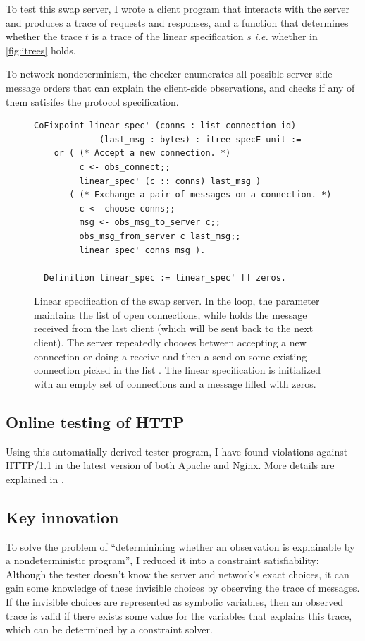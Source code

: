 To test this swap server, I wrote a client program that interacts with the
server and produces a trace of requests and responses, and a function that
determines whether the trace $t$ is a trace of the linear specification $s$ {\it
  i.e.} whether  in \autoref{fig:itrees} holds.

To network nondeterminism, the checker enumerates all possible server-side
message orders that can explain the client-side observations, and checks if any
of them satisifes the protocol specification.
\begin{figure}
\begin{lstlisting}[style=customcoq]
  CoFixpoint linear_spec' (conns : list connection_id)
             (last_msg : bytes) : itree specE unit :=
    or ( (* Accept a new connection. *)
         c <- obs_connect;;
         linear_spec' (c :: conns) last_msg )
       ( (* Exchange a pair of messages on a connection. *)
         c <- choose conns;;
         msg <- obs_msg_to_server c;;
         obs_msg_from_server c last_msg;;
         linear_spec' conns msg ).

  Definition linear_spec := linear_spec' [] zeros.
\end{lstlisting}
\caption[Linear specification of a swap server.]{Linear specification of the
  swap server.  In the  loop, the parameter 
  maintains the list of open connections, while  holds the message
  received from the last client (which will be sent back to the next client).
  The server repeatedly chooses between accepting a new connection or doing a
  receive and then a send on some existing connection picked in the list
  .  The linear specification is initialized with an empty set of
  connections and a message filled with zeros.}
\label{fig:linear-spec}
\end{figure}

\subsection{Online testing of HTTP}

Using this automatially derived tester program, I have found violations against
HTTP/1.1 in the latest version of both Apache and Nginx.  More details are
explained in \textcite{issta21}.

\subsection{Key innovation}
To solve the problem of ``determinining whether an observation is explainable by
a nondeterministic program'', I reduced it into a constraint
satisfiability: Although the tester doesn't know the server and network's exact
choices, it can gain some knowledge of these invisible choices by observing the
trace of messages.  If the invisible choices are represented as symbolic
variables, then an observed trace is valid if there exists some value for the
variables that explains this trace, which can be determined by a constraint
solver.

\fi
